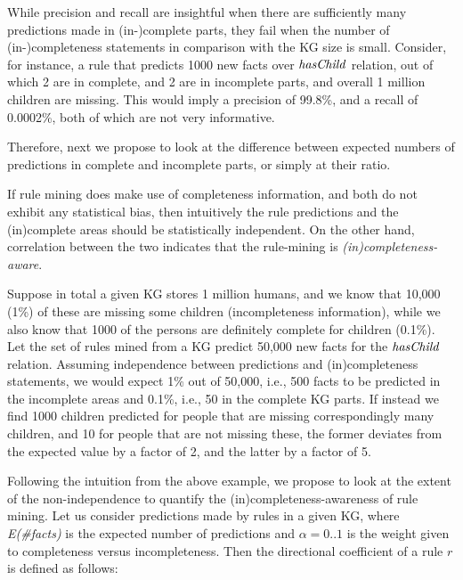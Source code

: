 While precision and recall are insightful when there are sufficiently many predictions made in (in-)complete %
parts, they fail when the number of (in-)completeness statements in comparison with the KG size is small. Consider, for instance, a rule that predicts 1000 new facts over $\mathit{hasChild}$ relation, out of which 2 are in complete, and 2 are in incomplete parts, and 
overall 
1 million children are missing. 
This would imply a precision of 99.8\%, and a recall of 0.0002\%, both of which are 
not very informative.

Therefore, next we propose to look at the difference between  
expected numbers of predictions in complete and incomplete parts, or simply at their ratio.

 If rule mining does make use of completeness information, and both do not exhibit any statistical bias, then intuitively the rule predictions and the (in)complete areas should be statistically independent. On the other hand, correlation between the two indicates that the rule-mining is \emph{(in)completeness-aware}. 

\begin{example}
Suppose in total a given KG stores 1 million humans, and we know that 10,000 (1\%) of these are missing some children (incompleteness information), while we also know that 1000 of the persons are definitely complete for children (0.1\%). Let the set of rules mined from a KG predict 50,000 new facts for the $\mathit{hasChild}$ relation. Assuming independence between predictions and (in)completeness statements, we would expect 1\% out of 50,000, i.e., 500 facts to be predicted in the incomplete areas and 0.1\%, i.e., 50 in the complete KG parts. If instead we find 1000 children predicted for people that are missing correspondingly many children, and 10 for people that are not missing these, the former deviates from the expected value by a factor of 2, and the latter by a factor of 5.
\end{example}
%
%
Following the intuition from the above example, we propose to look at the extent of the non-independence to quantify the (in)completeness-awareness of rule mining. Let us consider predictions made by rules in a given KG, where \textit{E(\#facts)} is the expected number of predictions and $\alpha=0..1$ is the weight given to completeness versus incompleteness. Then the directional coefficient of a rule $r$ is defined as follows:

